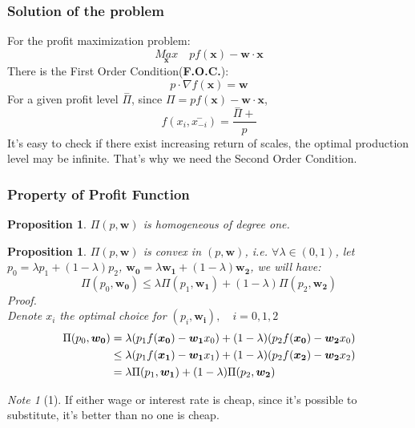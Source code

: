 \documentclass{article}
\theoremstyle{plain}
\newtheorem{prop}[thm]{Proposition}
\theoremstyle{definition}
\theoremstyle{remark}
\newtheorem*{note}{Note}
\begin{document}
\subsubsection{Solution of the problem}
For the profit maximization problem:
\begin{equation}
	\underset{\bm{x}}{Max}\quad p f(\bm{x}) - \bm{w}\cdot\bm{x}
\end{equation}
There is the First Order Condition({\bf F.O.C.}):
\begin{equation}
	p \cdot \nabla f(\bm{x})  = \bm{w}
\end{equation}
For a given profit level $\overset{-}{\Pi}$, since $\Pi = p f(\bm{x}) - \bm{w} \cdot \bm{x}$, 
\begin{equation}
	f(x_i,\overset{-}{x_{-i}}) = \frac{\overset{-}{\Pi}+}{p}
\end{equation} 
It's easy to check if there exist increasing return of scales, the optimal production level may be infinite. That's why we need the Second Order Condition. 
\subsubsection{Property of Profit Function}
\begin{prop}
$\Pi(p,\bm{w})$ is homogeneous of degree one.
\end{prop}
\begin{prop}
$\Pi(p,\bm{w})$ is convex in $(p,\bm{w})$, i.e. $\forall \lambda \in (0,1)$, let $p_0 = \lambda p_1 + (1-\lambda)p_2$, $\bm{w_0} = \lambda \bm{w_1} + (1-\lambda) \bm{w_2}$, we will have:
\begin{equation}
	\Pi(p_0,\bm{w_0})\leq \lambda \Pi(p_1,\bm{w_1}) + (1-\lambda)\Pi(p_2,\bm{w_2})
\end{equation}
Proof.\\
Denote $x_i$ the optimal choice for $(p_i,\bm{w_i}),\quad i = 0, 1, 2$ 
\begin{align} \notag
\Pi(p_0,\bm{w_0}) &= \lambda (p_1 f(\bm{x_0})-\bm{w_1}x_0) + (1-\lambda) (p_2 f(\bm{x_0})-\bm{w_2}x_0)\\ \notag
		& \leq \lambda (p_1 f(\bm{x_1}) -\bm{w_1}x_1) + (1-\lambda)(p_2 f(\bm{x_2})-\bm{w_2}x_2)\\ \notag
		& = \lambda \Pi(p_1,\bm{w_1}) + (1-\lambda)\Pi(p_2,\bm{w_2})
\end{align}
\end{prop}
\begin{note}[1]
If either wage or interest rate is cheap, since it's possible to substitute, it's better than no one is cheap.
\end{note}
\end{document}
